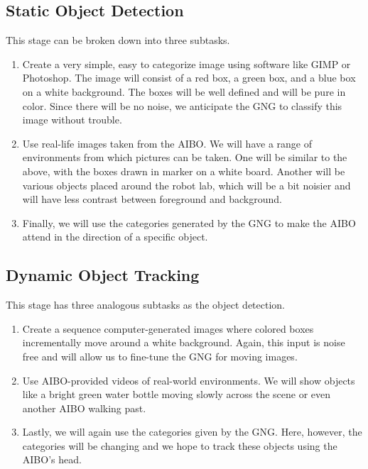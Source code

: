 \documentclass{article}
\begin{document}
\subsection{Static Object Detection}

This stage can be broken down into three subtasks.

\begin{enumerate}
  \item Create a very simple, easy to categorize image using software like GIMP or Photoshop. The image will consist of a red box, a green box, and a blue box on a white background. The boxes will be well defined and will be pure in color. Since there will be no noise, we anticipate the GNG to classify this image without trouble.
  \item Use real-life images taken from the AIBO. We will have a range of environments from which pictures can be taken. One will be similar to the above, with the boxes drawn in marker on a white board. Another will be various objects placed around the robot lab, which will be a bit noisier and will have less contrast between foreground and background.
  \item Finally, we will use the categories generated by the GNG to make the AIBO attend in the direction of a specific object.
\end{enumerate}

\subsection{Dynamic Object Tracking}

This stage has three analogous subtasks as the object detection.

\begin{enumerate}
  \item Create a sequence computer-generated images where colored boxes incrementally move around a white background. Again, this input is noise free and will allow us to fine-tune the GNG for moving images.
  \item Use AIBO-provided videos of real-world environments. We will show objects like a bright green water bottle moving slowly across the scene or even another AIBO walking past.
  \item Lastly, we will again use the categories given by the GNG. Here, however, the categories will be changing and we hope to track these objects using the AIBO's head.
\end{enumerate}
\end{document}
